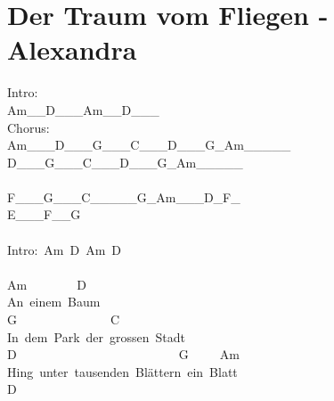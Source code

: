 \documentclass[]{book}
\let\stdsection\section
\renewcommand\section{\clearpage\stdsection}
\begin{document}
\hypertarget{der-traum-vom-fliegen---alexandra}{%
\section{Der Traum vom Fliegen - Alexandra}\label{der-traum-vom-fliegen---alexandra}}

Intro:\\
Am\_\_\textbar D\_\_\_\textbar Am\_\_\textbar D\_\_\_\textbar{}\\
Chorus:\\
Am\_\_\_\textbar D\_\_\_\textbar G\_\_\_\textbar C\_\_\_\textbar D\_\_\_\textbar G\_Am\_\textbar\_\_\_\_\textbar{}\\
D\_\_\_\textbar G\_\_\_\textbar C\_\_\_\textbar D\_\_\_\textbar G\_Am\_\textbar\_\_\_\_\textbar{}\\
~\\
F\_\_\_\textbar G\_\_\_\textbar C\_\_\_\textbar\_\_G\_\textbar Am\_\_\_\textbar D\_F\_\textbar{}\\
E\_\_\_\textbar F\_\_G\textbar{}\\
~\\
Intro:~Am~D~Am~D\\
~\\
Am~~~~~~~~D\\
An~einem~Baum\\
G~~~~~~~~~~~~~~~C\\
In~dem~Park~der~grossen~Stadt\\
D~~~~~~~~~~~~~~~~~~~~~~~~~~G~~~~~Am\\
Hing~unter~tausenden~Blättern~ein~Blatt\\
\hspace*{0.333em}\hspace*{0.333em}\hspace*{0.333em}\hspace*{0.333em}\hspace*{0.333em}\hspace*{0.333em}\hspace*{0.333em}\hspace*{0.333em}\hspace*{0.333em}\hspace*{0.333em}\hspace*{0.333em}\hspace*{0.333em}\hspace*{0.333em}\hspace*{0.333em}\hspace*{0.333em}\hspace*{0.333em}\hspace*{0.333em}\hspace*{0.333em}\hspace*{0.333em}D\\
\end{document}
